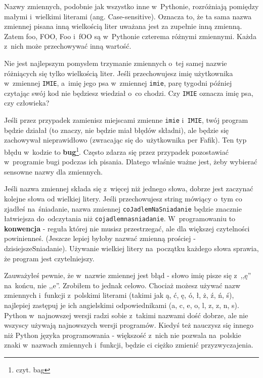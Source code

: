 \documentclass{book}
\begin{document}
Nazwy zmiennych, podobnie jak wszystko inne w~Pythonie, rozróżniają pomiędzy małymi i~wielkimi literami (ang. Case-sensitive). Oznacza to, że ta sama nazwa zmiennej pisana inną wielkością liter uważana jest za zupełnie inną zmienną. Zatem foo, FOO, Foo i~fOO są w~Pythonie czterema różnymi zmiennymi. Każda z~nich może przechowywać inną wartość.

Nie jest najlepszym pomysłem trzymanie zmiennych o~tej samej nazwie różniących się tylko wielkością liter. Jeśli przechowujesz imię użytkownika w~zmiennej \lstinline{IMIE}, a~imię jego psa w~zmiennej \lstinline{imie}, parę tygodni później czytając swój kod nie będziesz wiedział o~co chodzi. Czy \lstinline{IMIE} oznacza imię psa, czy człowieka?

Jeśli przez przypadek zamienisz miejscami zmienne \lstinline{imie} i~\lstinline{IMIE}, twój program będzie działał (to znaczy, nie będzie miał błędów składni), ale będzie się zachowywał nieprawidłowo (zwracając się do~użytkownika per Fafik). Ten typ błędu w~kodzie to {\bf bug}\footnote{czyt. bag}. Często zdarza się przez przypadek pozostawiać w~programie bugi podczas ich pisania. Dlatego właśnie ważne jest, żeby wybierać sensowne nazwy dla zmiennych.

Jeśli nazwa zmiennej składa się z~więcej niż jednego słowa, dobrze jest zaczynać kolejne słowa od wielkiej litery. Jeśli przechowujesz string mówiący o~tym co zjadłeś na~śniadanie, nazwa zmiennej \lstinline{coJadlemNaSniadanie} będzie znacznie łatwiejsza do~odczytania niż \lstinline{cojadlemnasniadanie}. W~programowaniu to {\bf konwencja} - reguła której nie musisz przestrzegać, ale dla większej czytelności powinienneś. (Jeszcze lepiej byłoby nazwać zmienną prościej - dzisiejszeSniadanie). Używanie wielkiej litery na~początku każdego słowa sprawia, że program jest czytelniejszy.

Zauważyłeś pewnie, że w~nazwie zmiennej jest błąd - słowo imię pisze się z~,,ę'' na~końcu, nie ,,e''. Zrobiłem to jednak celowo. Chociaż możesz używać nazw zmiennych i~funkcji z~polskimi literami (takimi jak ą, ć, ę, ó, ł, ż, ź, ń, ś), najlepiej zastępuj je ich angielskimi odpowiednikami (a, c, e, o, l, z, z, n, s). Python w~najnowszej wersji radzi sobie z~takimi nazwami dość dobrze, ale nie wszyscy używają najnowszych wersji programów. Kiedyś też nauczysz się innego niż Python języka programowania - większość z~nich nie pozwala na~polskie znaki w~nazwach zmiennych i~funkcji, będzie ci ciężko zmienić przyzwyczajenia.
\end{document}
